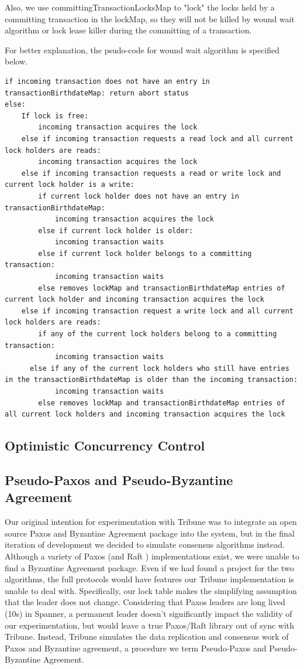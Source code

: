 \documentclass[10pt,twocolumn]{article}
\begin{document}
Also, we use committingTransactionLocksMap to "lock" the locks held by a committing transaction in the lockMap, so they will not be killed by wound wait algorithm or lock lease killer during the committing of a transaction.

For better explanation, the psudo-code for wound wait algorithm is specified below.
\begin{lstlisting}
if incoming transaction does not have an entry in transactionBirthdateMap: return abort status
else:
	If lock is free:
		incoming transaction acquires the lock
	else if incoming transaction requests a read lock and all current lock holders are reads:
		incoming transaction acquires the lock	
	else if incoming transaction requests a read or write lock and current lock holder is a write:
		if current lock holder does not have an entry in transactionBirthdateMap: 
			incoming transaction acquires the lock
		else if current lock holder is older: 
			incoming transaction waits
		else if current lock holder belongs to a committing transaction:
			incoming transaction waits
		else removes lockMap and transactionBirthdateMap entries of current lock holder and incoming transaction acquires the lock
    else if incoming transaction request a write lock and all current lock holders are reads:
		if any of the current lock holders belong to a committing transaction:
			incoming transaction waits
      else if any of the current lock holders who still have entries in the transactionBirthdateMap is older than the incoming transaction:
			incoming transaction waits
		else removes lockMap and transactionBirthdateMap entries of all current lock holders and incoming transaction acquires the lock

\end{lstlisting}


\subsection{Optimistic Concurrency Control}

\subsection{Pseudo-Paxos and Pseudo-Byzantine Agreement}

Our original intention for experimentation with Tribune was to integrate an open source Paxos and Byzantine Agreement package into the system, but in the final iteration of development we decided to simulate consensus algorithms instead. Although a variety of Paxos (and Raft \cite{ongaro_search_2014} ) implementations exist, we were unable to find a  Byzantine Agreement package. Even if we had found a project for the two algorithms, the full protocols would have features our Tribune implementation is unable to deal with. Specifically, our lock table makes the simplifying assumption that the leader does not change. Considering that Paxos leaders are long lived (10s) in Spanner, a permanent leader doesn't significantly impact the validity of our experimentation, but would leave a true Paxos/Raft library out of sync with Tribune. Instead, Tribune simulates the data replication and consensus work of Paxos and Byzantine agreement, a procedure we term Pseudo-Paxos and Pseudo-Byzantine Agreement.
\end{document}
